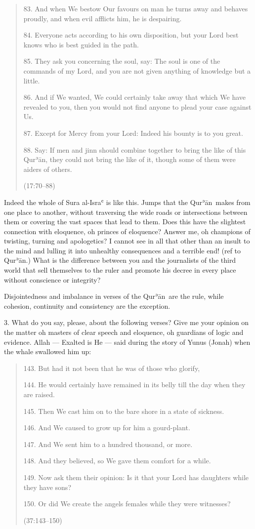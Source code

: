 \documentclass[12pt]{memoir}
\def\´{ʾ} %
\def\`{ʿ} %
\def \Quran{Qur\-\´ān} %
\newcommand{\QRef}[1]{{\color{darkblue}#1}}
\begin{document}
\begin{quote}
83. And when We bestow Our favours on man he turns away and behaves proudly,
and when evil afflicts him, he is despairing.

84. Everyone acts according to his own disposition,
but your Lord best knows who is best guided in the path.

85. They ask you concerning the soul, say:
The soul is one of the commands of my Lord,
and you are not given anything of knowledge but a little.

86. And if We wanted, We could certainly take away
that which We have revealed to you,
then you would not find anyone to plead your case against Us.

87. Except for Mercy from your Lord: Indeed his bounty is to you great.

88. Say: If men and jinn should combine together
to bring the like of this \Quran,
they could not bring the like of it,
though some of them were aiders of others.

(\QRef{17:70–88})
\end{quote}

Indeed the whole of Sura al-Isra\` is like this.
Jumps that the \Quran\ makes from one place to another,
without traversing the wide roads or intersections between them
or covering the vast spaces that lead to them.
Does this have the slightest connection with eloquence,
oh princes of eloquence?
Answer me, oh champions of twisting, turning and apologetics?
I cannot see in all that other than an insult to the mind
and lulling it into unhealthy consequences and a terrible end!
(ref to \Quran.)\@
What is the difference between you and the journalists of the third world
that sell themselves to the ruler and promote his decree
in every place without conscience or integrity?

Disjointedness and imbalance in verses of the \Quran\ are the rule,
while cohesion, continuity and consistency are the exception.

3. What do you say, please, about the following verses?
Give me your opinion on the matter oh masters of clear speech and eloquence,
oh guardians of logic and evidence.
Allah — Exalted is He — said during the story of Yunus (Jonah)
when the whale swallowed him up:

\begin{quote}
143. But had it not been that he was of those who glorify,

144. He would certainly have remained in its belly
till the day when they are raised.

145. Then We cast him on to the bare shore in a state of sickness.

146. And We caused to grow up for him a gourd-plant.

147. And We sent him to a hundred thousand, or more.

148. And they believed, so We gave them comfort for a while.

149. Now ask them their opinion:
Is it that your Lord has daughters while they have sons?

150. Or did We create the angels females while they were witnesses?

(\QRef{37:143–150})
\end{quote}
\end{document}
